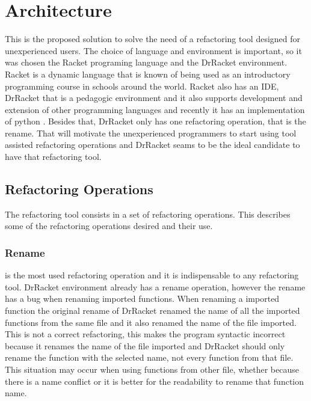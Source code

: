 
% 
% 

\section{Architecture}

This is the proposed solution to solve the need of a refactoring tool designed for unexperienced users.
The choice of language and environment is important, so it was chosen the Racket programing language and the DrRacket environment.
Racket is a dynamic language that is known of being used as an introductory programming course in schools around the world. 
Racket also has an IDE, DrRacket that is a pedagogic environment \cite{drscheme_pegadogy} and it also supports development and extension of other programming languages \cite{tobin2011languages} and recently it has an implementation of python \cite{ramos2014implementation}.
Besides that, DrRacket only has one refactoring operation, that is the rename.
That will motivate the unexperienced programmers to start using tool assisted refactoring operations and DrRacket seams to be the ideal candidate to have that refactoring tool.


\subsection{Refactoring Operations}
The refactoring tool consists in a set of refactoring operations.
This describes some of the refactoring operations desired and their use.

\subsubsection{Rename}
\label{ssub:Rename}
is the most used refactoring operation and it is indispensable to any refactoring tool.
DrRacket environment already has a rename operation, however the rename has a bug when renaming imported functions.
When renaming a imported function the original rename of DrRacket renamed the name of all the imported functions from the same file and it also renamed the name of the file imported.
This is not a correct refactoring, this makes the program syntactic incorrect because it renames the name of the file imported and DrRacket should only rename the function with the selected name, not every function from that file.
This situation may occur when using functions from other file, whether because there is a name conflict or it is better for the readability to rename that function name.


